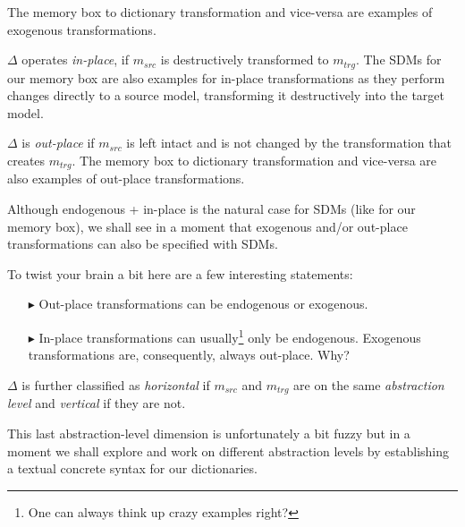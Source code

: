 The memory box to dictionary transformation and vice-versa are examples of exogenous transformations.

$\Delta$ operates \emph{in-place}, if $m_{src}$ is destructively transformed to $m_{trg}$.
The SDMs for our memory box are also examples for in-place transformations as they perform changes directly to a source model, transforming it destructively into the target model.


$\Delta$ is \emph{out-place} if $m_{src}$ is left intact and is not changed by the transformation that creates $m_{trg}$.
The memory box to dictionary transformation and vice-versa are also examples of out-place transformations.

Although endogenous + in-place is the natural case for SDMs (like for our memory box), we shall see in a moment that exogenous and/or out-place transformations can also be specified with SDMs.

\vspace{1.5cm}
 
To twist your brain a bit here are a few interesting statements:
\begin{enumerate}
\item[$\blacktriangleright$] Out-place transformations can be endogenous or exogenous.

\item[$\blacktriangleright$] In-place transformations can usually\footnote{One can always think up crazy examples right?} only be endogenous.  Exogenous transformations are, consequently, always out-place.  Why? 
\end{enumerate}  

\vspace{1.5cm}
   
$\Delta$ is further classified as \emph{horizontal} if $m_{src}$ and $m_{trg}$ are on the same \emph{abstraction level} and \emph{vertical} if they are not. 

This last abstraction-level dimension is unfortunately a bit fuzzy but in a moment we shall explore and work on 
different abstraction levels by establishing a textual concrete syntax for our dictionaries.

\clearpage

